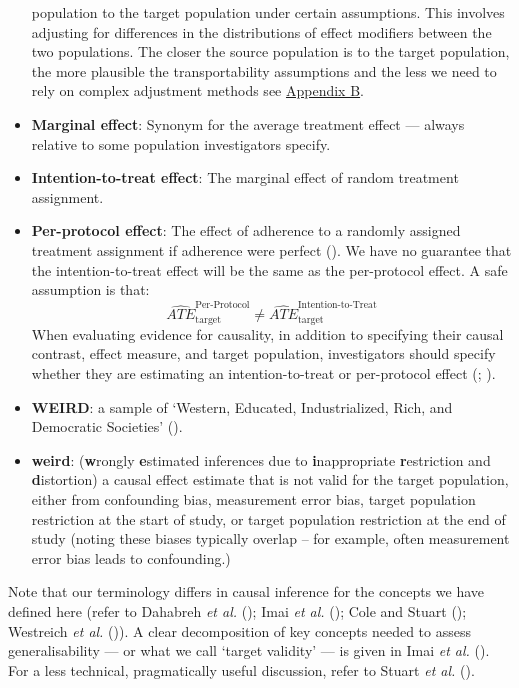 \documentclass[
  single column]{article}
\begin{document}
\begin{itemize}
  population to the target population under certain assumptions. This
  involves adjusting for differences in the distributions of effect
  modifiers between the two populations. The closer the source
  population is to the target population, the more plausible the
  transportability assumptions and the less we need to rely on complex
  adjustment methods see \hyperref[id-app-b]{Appendix B}.
\item
  \textbf{Marginal effect}: Synonym for the average treatment effect ---
  always relative to some population investigators specify.
\item
  \textbf{Intention-to-treat effect}: The marginal effect of random
  treatment assignment.
\item
  \textbf{Per-protocol effect}: The effect of adherence to a randomly
  assigned treatment assignment if adherence were perfect
  (). We have no
  guarantee that the intention-to-treat effect will be the same as the
  per-protocol effect. A safe assumption is that: \[
  \widehat{ATE}_{\text{target}}^{\text{Per-Protocol}} \ne \widehat{ATE}_{\text{target}}^{\text{Intention-to-Treat}}
  \] When evaluating evidence for causality, in addition to specifying
  their causal contrast, effect measure, and target population,
  investigators should specify whether they are estimating an
  intention-to-treat or per-protocol effect
  (;
  ).
\item
  \textbf{WEIRD}: a sample of `Western, Educated, Industrialized, Rich,
  and Democratic Societies' ().
\item
  \textbf{weird}: (\textbf{w}rongly \textbf{e}stimated inferences due to
  \textbf{i}nappropriate \textbf{r}estriction and \textbf{d}istortion) a
  causal effect estimate that is not valid for the target population,
  either from confounding bias, measurement error bias, target
  population restriction at the start of study, or target population
  restriction at the end of study (noting these biases typically overlap
  -- for example, often measurement error bias leads to confounding.)
\end{itemize}

Note that our terminology differs in causal inference for the concepts
we have defined here (refer to Dahabreh \emph{et al.}
(); Imai \emph{et al.}
(); Cole and Stuart
(); Westreich \emph{et al.}
()). A clear
decomposition of key concepts needed to assess generalisability --- or
what we call `target validity' --- is given in Imai \emph{et al.}
(). For a less technical,
pragmatically useful discussion, refer to Stuart \emph{et al.}
().
\end{document}
